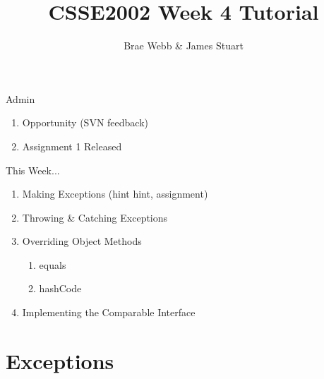 \documentclass[week4]{csse2002}
\author{Brae Webb \& James Stuart}
\title{CSSE2002 Week 4 Tutorial}
\begin{document}
\begin{frame}
\maketitle
\end{frame}

\begin{topic}{Admin}
\begin{enumerate}
    \item Opportunity (SVN feedback)
    \item Assignment 1 Released
\end{enumerate}
\end{topic}

\begin{topic}{This Week...}
\begin{enumerate}
    \item Making Exceptions (hint hint, assignment)
    \item Throwing \& Catching Exceptions
    \item Overriding Object Methods
    \begin{enumerate}
    	\item equals
    	\item hashCode
    \end{enumerate}
    \item Implementing the Comparable Interface
\end{enumerate}
\end{topic}

\section{Exceptions}
\end{document}
